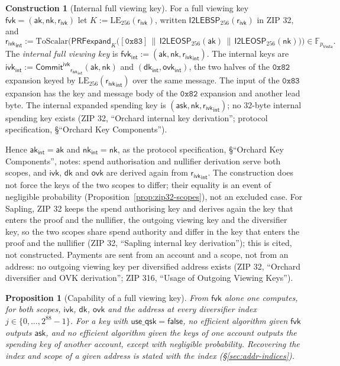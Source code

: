 \documentclass[11pt,a4paper]{article}
\newtheorem{proposition}[theorem]{Proposition}
\theoremstyle{definition}
\newtheorem{construction}[theorem]{Construction}
\newcommand{\F}{\mathbb{F}}
\newcommand{\Vesta}{\ensuremath{\mathsf{Vesta}}}
\newcommand{\CommitIvk}{\ensuremath{\mathsf{Commit}^{\mathsf{ivk}}}}
\newcommand{\ask}{\ensuremath{\mathsf{ask}}}
\newcommand{\aksym}{\ensuremath{\mathsf{ak}}}
\newcommand{\nksym}{\ensuremath{\mathsf{nk}}}
\newcommand{\ivk}{\ensuremath{\mathsf{ivk}}}
\newcommand{\fvk}{\ensuremath{\mathsf{fvk}}}
\newcommand{\ovk}{\ensuremath{\mathsf{ovk}}}
\newcommand{\dk}{\ensuremath{\mathsf{dk}}}
\newcommand{\rivk}{\ensuremath{\mathsf{r_{ivk}}}}
\begin{document}
\begin{construction}[Internal full viewing key]\label{def:zip32-internal}
For a full viewing key $\fvk = (\aksym, \nksym, \rivk)$ let
$K := \mathrm{LE}_{256}(\rivk)$, written $\mathsf{I2LEBSP}_{256}(\rivk)$ in
ZIP 32, and
\[
  \rivk_{\mathsf{int}} := \mathrm{ToScalar}\bigl(\mathsf{PRFexpand}_K\bigl(
    [\mathtt{0x83}] \,\|\, \mathsf{I2LEOSP}_{256}(\aksym) \,\|\,
    \mathsf{I2LEOSP}_{256}(\nksym)\bigr)\bigr) \in \F_{p_{\Vesta}}.
\]
The \emph{internal full viewing key} is $\fvk_{\mathsf{int}} :=
(\aksym, \nksym, \rivk_{\mathsf{int}})$. The internal keys are
$\ivk_{\mathsf{int}} := \CommitIvk_{\rivk_{\mathsf{int}}}(\aksym, \nksym)$
and $(\dk_{\mathsf{int}}, \ovk_{\mathsf{int}})$, the two halves of the
$\mathtt{0x82}$ expansion keyed by $\mathrm{LE}_{256}(\rivk_{\mathsf{int}})$
over the same message. The input of the $\mathtt{0x83}$ expansion has the
key and message body of the $\mathtt{0x82}$ expansion and another lead
byte. The internal expanded spending key is
$(\ask, \nksym, \rivk_{\mathsf{int}})$; no $32$-byte internal spending key
exists (ZIP 32, ``Orchard internal key derivation''; protocol
specification, \S``Orchard Key Components'').
\end{construction}

Hence $\aksym_{\mathsf{int}} = \aksym$ and $\nksym_{\mathsf{int}} =
\nksym$, as the protocol specification, \S``Orchard Key Components'',
notes: spend authorisation and nullifier derivation serve both scopes, and
$\ivk$, $\dk$ and $\ovk$ are derived again from $\rivk_{\mathsf{int}}$. The
construction does not force the keys of the two scopes to differ; their
equality is an event of negligible probability
(Proposition~\ref{prop:zip32-scopes}), not an excluded case. For Sapling,
ZIP 32 keeps the spend authorising key and derives again the key that
enters the proof and the nullifier, the outgoing viewing key and the
diversifier key, so the two scopes share spend authority and differ in the
key that enters the proof and the nullifier (ZIP 32, ``Sapling internal key
derivation''); this is cited, not constructed. Payments are sent from an
account and a scope, not from an address: no outgoing viewing key per
diversified address exists (ZIP 32, ``Orchard diversifier and OVK
derivation''; ZIP 316, ``Usage of Outgoing Viewing Keys'').

\begin{proposition}[Capability of a full viewing key]\label{prop:zip32-fvk}
From $\fvk$ alone one computes, for both scopes, $\ivk$, $\dk$, $\ovk$ and
the address at every diversifier index $j \in \{0, \dots, 2^{88} - 1\}$. For
a key with $\mathsf{use\_qsk} = \mathsf{false}$, no efficient algorithm
given $\fvk$ outputs $\ask$, and no efficient algorithm given the keys of
one account outputs the spending key of another account, except with
negligible probability. Recovering the index and scope of a given address
is stated with the index (\S\ref{sec:addr-indices}).
\end{proposition}
\end{document}
